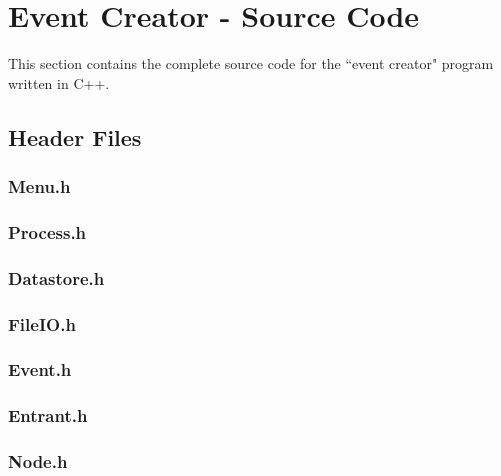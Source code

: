 \documentclass[a4paper, 12pt]{article}
\begin{document}
\clearpage

\section{Event Creator - Source Code}

This section contains the complete source code for the ``event creator" program written in C++.

\subsection{Header Files}

\subsubsection{Menu.h}


\clearpage
\subsubsection{Process.h}


\clearpage
\subsubsection{Datastore.h}


\clearpage
\subsubsection{FileIO.h}


\clearpage
\subsubsection{Event.h}


\clearpage
\subsubsection{Entrant.h}


\clearpage
\subsubsection{Node.h}

\end{document}
